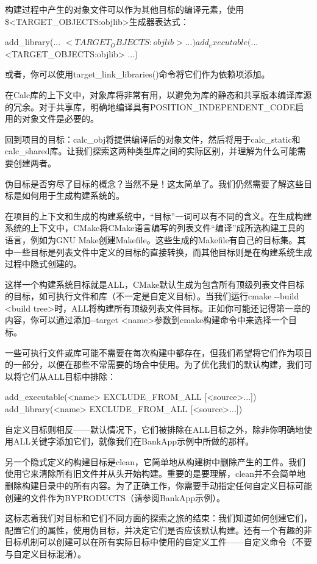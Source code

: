 构建过程中产生的对象文件可以作为其他目标的编译元素，使用\$<TARGET\_OBJECTS:objlib>生成器表达式：

\begin{shell}
add_library(... $<TARGET_OBJECTS:objlib> ...)
add_executable(... $<TARGET_OBJECTS:objlib> ...)
\end{shell}

或者，你可以使用target\_link\_libraries()命令将它们作为依赖项添加。

在Calc库的上下文中，对象库将非常有用，以避免为库的静态和共享版本编译库源的冗余。对于共享库，明确地编译具有POSITION\_INDEPENDENT\_CODE启用的对象文件是必要的。

回到项目的目标：calc\_obj将提供编译后的对象文件，然后将用于calc\_static和calc\_shared库。让我们探索这两种类型库之间的实际区别，并理解为什么可能需要创建两者。

伪目标是否穷尽了目标的概念？当然不是！这太简单了。我们仍然需要了解这些目标是如何用于生成构建系统的。


在项目的上下文和生成的构建系统中，“目标”一词可以有不同的含义。在生成构建系统的上下文中，CMake将CMake语言编写的列表文件“编译”成所选构建工具的语言，例如为GNU Make创建Makefile。这些生成的Makefile有自己的目标集。其中一些目标是列表文件中定义的目标的直接转换，而其他目标则是在构建系统生成过程中隐式创建的。

这样一个构建系统目标就是ALL，CMake默认生成为包含所有顶级列表文件目标的目标，如可执行文件和库（不一定是自定义目标）。当我们运行cmake -{}-build <build tree>时，ALL将构建所有顶级列表文件目标。正如你可能还记得第一章的内容，你可以通过添加-{}-target <name>参数到cmake构建命令中来选择一个目标。

一些可执行文件或库可能不需要在每次构建中都存在，但我们希望将它们作为项目的一部分，以便在那些不常需要的场合中使用。为了优化我们的默认构建，我们可以将它们从ALL目标中排除：

\begin{shell}
add_executable(<name> EXCLUDE_FROM_ALL [<source>...])
add_library(<name> EXCLUDE_FROM_ALL [<source>...])
\end{shell}

自定义目标则相反——默认情况下，它们被排除在ALL目标之外，除非你明确地使用ALL关键字添加它们，就像我们在BankApp示例中所做的那样。

另一个隐式定义的构建目标是clean，它简单地从构建树中删除产生的工件。我们使用它来清除所有旧文件并从头开始构建。重要的是要理解，clean并不会简单地删除构建目录中的所有内容。为了正确工作，你需要手动指定任何自定义目标可能创建的文件作为BYPRODUCTS（请参阅BankApp示例）。

这标志着我们对目标和它们不同方面的探索之旅的结束：我们知道如何创建它们，配置它们的属性，使用伪目标，并决定它们是否应该默认构建。还有一个有趣的非目标机制可以创建可以在所有实际目标中使用的自定义工件——自定义命令（不要与自定义目标混淆）。

